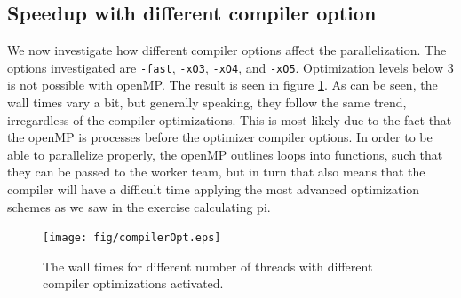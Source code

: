 \subsection{Speedup with different compiler option}
We now investigate how different compiler options affect the parallelization. The options investigated are \texttt{-fast}, \texttt{-xO3}, \texttt{-xO4}, and \texttt{-xO5}. Optimization levels below 3 is not possible with openMP. The result is seen in figure \ref{fig:compiler}. As can be seen, the wall times vary a bit, but generally speaking, they follow the same trend, irregardless of the compiler optimizations. This is most likely due to the fact that the openMP is processes before the optimizer compiler options. In order to be able to parallelize properly, the openMP outlines loops into functions, such that they can be passed to the worker team, but in turn that also means that the compiler will have a difficult time applying the most advanced optimization schemes as we saw in the exercise calculating pi.

\begin{figure}
\centering
\texttt{[image: fig/compilerOpt.eps]}
\caption{The wall times for different number of threads with different compiler optimizations activated.}
\label{fig:compiler}
\end{figure}
